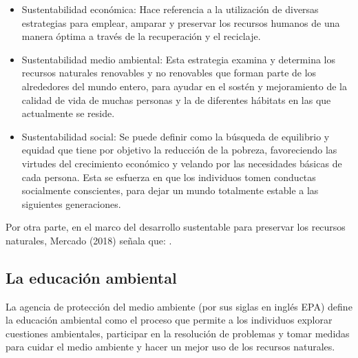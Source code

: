 \begin{itemize}
    \item Sustentabilidad económica: Hace referencia a la utilización de diversas estrategias para emplear, amparar y preservar los recursos humanos de una manera óptima a través de la recuperación y el reciclaje.
    
    \item Sustentabilidad medio ambiental: Esta estrategia examina y determina los recursos naturales renovables y no renovables que forman parte de los alrededores del mundo entero, para ayudar en el sostén y mejoramiento de la calidad de vida de muchas personas y la de diferentes hábitats en las que actualmente se reside.
    
    \item Sustentabilidad social: Se puede definir como la búsqueda de equilibrio y equidad que tiene por objetivo la reducción de la pobreza, favoreciendo las virtudes del crecimiento económico y velando por las necesidades básicas de cada persona. Esta se esfuerza en que los individuos tomen conductas socialmente conscientes, para dejar un mundo totalmente estable a las siguientes generaciones.
\end{itemize}

Por otra parte, en el marco del desarrollo sustentable para preservar los recursos naturales, Mercado (2018) señala que: . 

\subsection{La educación ambiental}

La agencia de protección del medio ambiente (por sus siglas en inglés EPA) define la educación ambiental como el proceso que permite a los individuos explorar cuestiones ambientales, participar en la resolución de problemas y tomar medidas para cuidar el medio ambiente y hacer un mejor uso de los recursos naturales.

